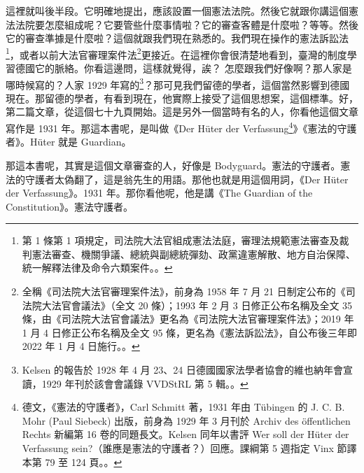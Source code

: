 \hypertarget{w05:cue:21}{}這裡就叫後半段。它明確地提出，應該設置一個憲法法院。然後它就跟你講這個憲法法院要怎麼組成呢？它要管些什麼事情啦？它的審查客體是什麼啦？等等。然後它的審查準據是什麼啦？這個就跟我們現在熟悉的。我們現在操作的憲法訴訟法\footnote{第 1 條第 1 項規定，司法院大法官組成憲法法庭，審理法規範憲法審查及裁判憲法審查、機關爭議、總統與副總統彈劾、政黨違憲解散、地方自治保障、統一解釋法律及命令六類案件。\cite{csfa}。}，或者以前大法官審理案件法\footnote{全稱《司法院大法官審理案件法》，前身為 1958 年 7 月 21 日制定公布的《司法院大法官會議法》（全文 20 條）；1993 年 2 月 3 日修正公布名稱及全文 35 條，由《司法院大法官會議法》更名為《司法院大法官審理案件法》；2019 年 1 月 4 日修正公布名稱及全文 95 條，更名為《憲法訴訟法》，自公布後三年即 2022 年 1 月 4 日施行。\cite{dfgslaw1993}。}更接近。在這裡你會很清楚地看到，臺灣的制度學習德國它的脈絡。你看這邊問，這樣就覺得，誒？
\hypertarget{w05:cue:22}{}怎麼跟我們好像啊？那人家是哪時候寫的？人家 1929 年寫的\footnote{Kelsen 的報告於 1928 年 4 月 23、24 日德國國家法學者協會的維也納年會宣讀，1929 年刊於該會會議錄 VVDStRL 第 5 輯。\cite{kelsen1929}。}？那可見我們留德的學者，這個當然影響到德國現在。那留德的學者，有看到現在，他實際上接受了這個思想案，這個標準。好，第二篇文章，從這個七十九頁開始。這是另外一個當時有名的人，你看他這個文章寫作是 1931 年。那這本書呢，是叫做《Der Hüter der Verfassung\footnote{德文，《憲法的守護者》，Carl Schmitt 著，1931 年由 Tübingen 的 J. C. B. Mohr (Paul Siebeck) 出版，前身為 1929 年 3 月刊於 Archiv des öffentlichen Rechts 新編第 16 卷的同題長文。Kelsen 同年以書評 Wer soll der Hüter der Verfassung sein?（誰應是憲法的守護者？）回應。課綱第 5 週指定 Vinx 節譯本第 79 至 124 頁。\cite{schmitt1931}。}》《憲法的守護者》。Hüter 就是 Guardian。

\hypertarget{w05:cue:23}{}那這本書呢，其實是這個文章審查的人，好像是 Bodyguard。憲法的守護者。憲法的守護者太偽翻了，這是翁先生的用語。那他也就是用這個用詞，《Der Hüter der Verfassung》。1931 年。那你看他呢，他是講《The Guardian of the Constitution》。憲法守護者。

